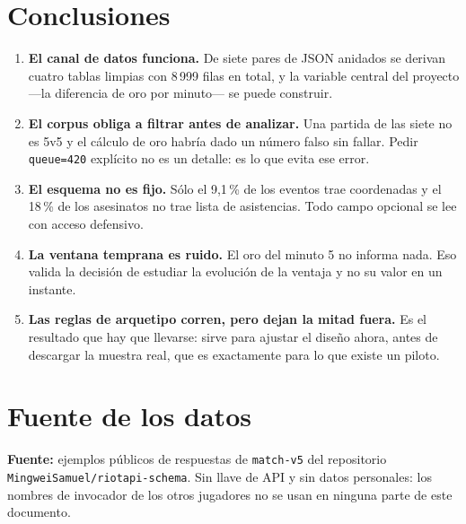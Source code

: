 \documentclass[11pt,letterpaper]{article}
\begin{document}
\section{Conclusiones}

\begin{enumerate}[leftmargin=1.6em,itemsep=.4em]
  \item \textbf{El canal de datos funciona.} De siete pares de JSON anidados se
        derivan cuatro tablas limpias con 8\,999 filas en total, y la variable
        central del proyecto —la diferencia de oro por minuto— se puede construir.
  \item \textbf{El corpus obliga a filtrar antes de analizar.} Una partida de las
        siete no es 5v5 y el cálculo de oro habría dado un número falso sin fallar.
        Pedir \texttt{queue=420} explícito no es un detalle: es lo que evita ese
        error.
  \item \textbf{El esquema no es fijo.} Sólo el 9,1\,\% de los eventos trae
        coordenadas y el 18\,\% de los asesinatos no trae lista de asistencias.
        Todo campo opcional se lee con acceso defensivo.
  \item \textbf{La ventana temprana es ruido.} El oro del minuto 5 no informa
        nada. Eso valida la decisión de estudiar la evolución de la ventaja y no
        su valor en un instante.
  \item \textbf{Las reglas de arquetipo corren, pero dejan la mitad fuera.} Es el
        resultado que hay que llevarse: sirve para ajustar el diseño ahora, antes
        de descargar la muestra real, que es exactamente para lo que existe un
        piloto.
\end{enumerate}

\section*{Fuente de los datos}

\noindent\textbf{Fuente:} ejemplos públicos de respuestas de \texttt{match-v5} del
repositorio \texttt{MingweiSamuel/riotapi-schema}. Sin llave de API y sin datos
personales: los nombres de invocador de los otros jugadores no se usan en ninguna
parte de este documento.

\vspace{.5cm}
\end{document}
